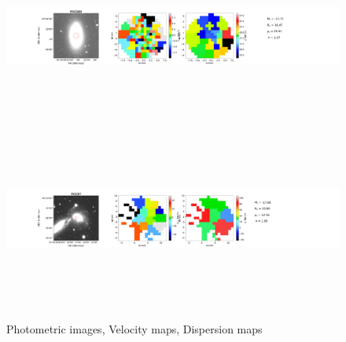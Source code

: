 \documentclass{aa}
\begin{document}
\begin{figure}[!htb]
   \includegraphics[width=21cm,height=6cm,keepaspectratio]{../2_pipeline/1_V&S_Maps/263Velocity_map.pdf}
   \includegraphics[width=21cm,height=6cm,keepaspectratio]{../2_pipeline/1_V&S_Maps/37Velocity_map.pdf}
         \caption{Photometric images, Velocity maps, Dispersion maps}
         \label{FigVelDis}
\end{figure}
\clearpage
%
\end{document}
